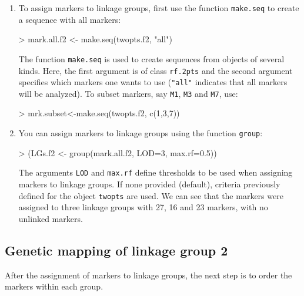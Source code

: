 \documentclass[letterpaper,12pt,oneside]{article}
\begin{document}
\begin{enumerate}
  
\item To assign markers to linkage groups, first use the function {\tt make.seq} to create a sequence with all markers:
\begin{Schunk}
\begin{Sinput}
> mark.all.f2 <- make.seq(twopts.f2, "all")
\end{Sinput}
\end{Schunk}
The function {\tt make.seq} is used to create sequences from objects of several kinds. Here, the first argument is of class {\tt rf.2pts} and the second argument specifies which markers one wants to use ({\tt "all"} indicates that all markers will be analyzed). To subset markers, say {\tt M1}, {\tt M3} and {\tt M7}, use:

\begin{Schunk}
\begin{Sinput}
> mrk.subset<-make.seq(twopts.f2, c(1,3,7))
\end{Sinput}
\end{Schunk}

\item You can assign markers to linkage groups using the function {\tt group}:
\begin{Schunk}
\begin{Sinput}
> (LGs.f2 <- group(mark.all.f2, LOD=3, max.rf=0.5))
\end{Sinput}
\end{Schunk}
The arguments {\tt LOD} and {\tt max.rf} define thresholds to be used when assigning markers to linkage groups. If none provided (default), criteria previously defined for the object {\tt twopts} are used. We can see that the markers were assigned to three linkage groups with 27, 16 and 23 markers, with no unlinked markers.
\end{enumerate}

\subsection{Genetic mapping of linkage group 2}
After the assignment of markers to linkage groups, the next step is to order the markers within each group. 
\end{document}
